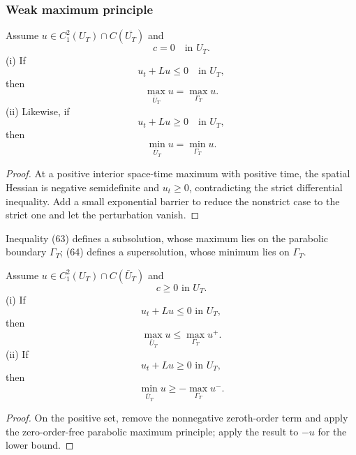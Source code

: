 \subsubsection{Weak maximum principle}

\begin{theorem}
\label{thm:parabolic-weak-maximum-principle}

Assume $u \in C^2_1(U_T) \cap C(\overline{U_T})$ and
\[
c = 0 \quad \text{in } U_T.
\tag{62}
\]
(i) If
\[
u_t + Lu \leq 0 \quad \text{in } U_T,
\tag{63}
\]
then
\[
\max_{\bar U_T} u = \max_{\Gamma_T} u.
\]
(ii) Likewise, if
\[
u_t + Lu \geq 0 \quad \text{in } U_T,
\tag{64}
\]
then
\[
\min_{\bar U_T} u = \min_{\Gamma_T} u.
\]
\end{theorem}

\begin{proof}
\sketch At a positive interior space-time maximum with positive time, the spatial Hessian is negative semidefinite and $u_t\ge0$, contradicting the strict differential inequality. Add a small exponential barrier to reduce the nonstrict case to the strict one and let the perturbation vanish.
\end{proof}

\begin{remark}
\label{rem:parabolic-subsolution-supersolution}

Inequality (63) defines a subsolution, whose maximum lies on the parabolic boundary $\Gamma_T$; (64) defines a supersolution, whose minimum lies on $\Gamma_T$.
\end{remark}

\begin{theorem}
\label{thm:parabolic-weak-maximum-principle-c-nonneg}

Assume $u \in C_1^2(U_T) \cap C(\bar{U}_T)$ and
\[
c \geq 0 \text{ in } U_T.
\]
(i) If
\[
u_t + Lu \leq 0 \text{ in } U_T,
\]
then
\[
\max_{\bar{U}_T} u \leq \max_{\Gamma_T} u^+.
\]
(ii) If
\[
u_t + Lu \geq 0 \text{ in } U_T,
\]
then
\[
\min_{\bar{U}_T} u \geq - \max_{\Gamma_T} u^-.
\]
\end{theorem}

\begin{proof}
\sketch On the positive set, remove the nonnegative zeroth-order term and apply the zero-order-free parabolic maximum principle; apply the result to $-u$ for the lower bound.
\end{proof}

